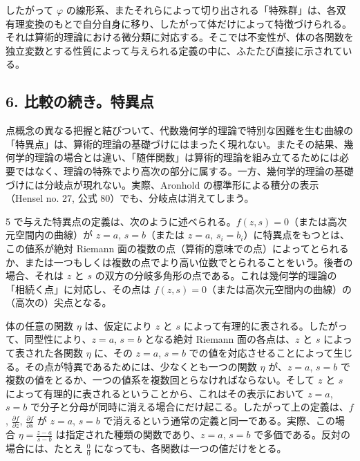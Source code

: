 \documentclass[11pt]{article}
\begin{document}
したがって \(\varphi\) の線形系、またそれらによって切り出される「特殊群」は、各双有理変換のもとで自分自身に移り、したがって体だけによって特徴づけられる。それは算術的理論における微分類に対応する。そこでは不変性が、体の各関数を独立変数とする性質によって与えられる定義の中に、ふたたび直接に示されている。

\subsection*{6. 比較の続き。特異点}
点概念の異なる把握と結びついて、代数幾何学的理論で特別な困難を生む曲線の「特異点」は、算術的理論の基礎づけにはまったく現れない。またその結果、幾何学的理論の場合とは違い、「随伴関数」は算術的理論を組み立てるためには必要ではなく、理論の特殊でより高次の部分に属する。一方、幾何学的理論の基礎づけには分岐点が現れない。実際、Aronhold の標準形による積分の表示（Hensel no. 27, 公式 80）でも、分岐点は消えてしまう。

5 で与えた特異点の定義は、次のように述べられる。\(f(z,s)=0\)（または高次元空間内の曲線）が \(z=a\), \(s=b\)（または \(z=a\), \(s_i=b_i\)）に特異点をもつとは、この値系が絶対 Riemann 面の複数の点（算術的意味での点）によってとられるか、または一つもしくは複数の点でより高い位数でとられることをいう。後者の場合、それは \(z\) と \(s\) の双方の分岐多角形の点である。これは幾何学的理論の「相続く点」に対応し、その点は \(f(z,s)=0\)（または高次元空間内の曲線）の（高次の）尖点となる。

体の任意の関数 \(\eta\) は、仮定により \(z\) と \(s\) によって有理的に表される。したがって、同型性により、\(z=a\), \(s=b\) となる絶対 Riemann 面の各点は、\(z\) と \(s\) によって表された各関数 \(\eta\) に、その \(z=a\), \(s=b\) での値を対応させることによって生じる。その点が特異であるためには、少なくとも一つの関数 \(\eta\) が、\(z=a\), \(s=b\) で複数の値をとるか、一つの値系を複数回とらなければならない。そして \(z\) と \(s\) によって有理的に表されるということから、これはその表示において \(z=a\), \(s=b\) で分子と分母が同時に消える場合にだけ起こる。したがって上の定義は、\(f\), \(\frac{\partial f}{\partial z}\), \(\frac{\partial f}{\partial s}\) が \(z=a\), \(s=b\) で消えるという通常の定義と同一である。実際、この場合 \(\eta=\frac{z-a}{s-b}\) は指定された種類の関数であり、\(z=a\), \(s=b\) で多価である。反対の場合には、たとえ \(\frac{0}{0}\) になっても、各関数は一つの値だけをとる。
\end{document}
